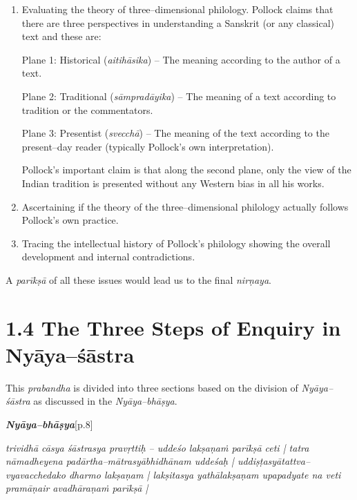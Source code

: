 \begin{enumerate}
\itemsep=0pt
\item 
 Evaluating the theory of three–dimensional philology. Pollock claims that there are three perspectives in understanding a Sanskrit (or any classical) text and these are:

\begin{myquote}
Plane 1: Historical (\textit{aitihāsika}) – The meaning according to the author of a text.
\end{myquote}

\begin{myquote}
Plane 2: Traditional (\textit{sāmpradāyika}) – The meaning of a text according to tradition or the commentators.
\end{myquote}

\begin{myquote}
Plane 3: Presentist (\textit{svecchā}) – The meaning of the text according to the present–day reader (typically Pollock’s own interpretation).
\end{myquote}

 Pollock’s important claim is that along the second plane, only the view of the Indian tradition is presented without any Western bias in all his works.

 \item Ascertaining if the theory of the three–dimensional philology actually follows Pollock’s own practice.

 \item Tracing the intellectual history of Pollock’s philology showing the overall development and internal contradictions.

\end{enumerate}

A \textit{parīkṣā} of all these issues would lead us to the final \textit{nirṇaya}.


\section*{1.4 The Three Steps of Enquiry in Nyāya–śāstra}

This \textit{prabandha} is divided into three sections based on the division of \textit{Nyāya–śāstra} as discussed in the \textit{Nyāya–bhāṣya}.

\textit{\textbf{Nyāya–bhāṣya}}[p.8]

\begin{myquote}
\textit{trividhā cāsya śāstrasya pravṛttiḥ – uddeśo lakṣaṇaṁ parīkṣā ceti | tatra nāmadheyena padārtha–mātrasyābhidhānam uddeśaḥ | uddiṣṭasyātattva–vyavacchedako dharmo lakṣaṇam | lakṣitasya yathālakṣaṇam upapadyate na veti pramāṇair avadhāraṇaṁ parīkṣā |}
\end{myquote}

